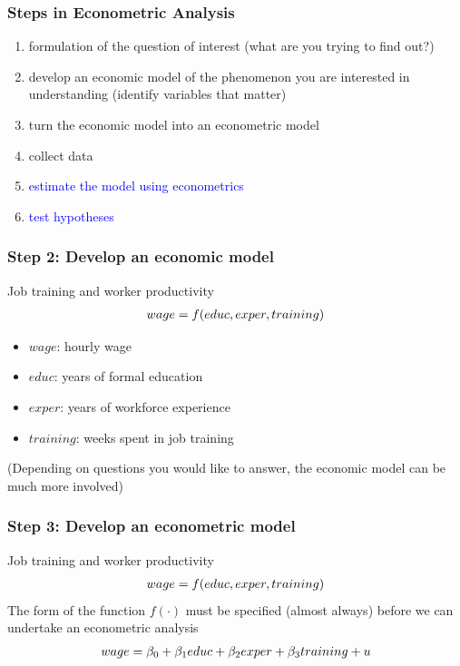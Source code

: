 \documentclass[fleqn]{beamer}\usepackage[]{graphicx}\usepackage[]{color}
\begin{document}
\begin{frame}[c]
  \frametitle{Steps in Econometric Analysis}
  \begin{enumerate}
     \item formulation of the question of interest (what are you trying to find out?)
     \item develop an economic model of the phenomenon you are interested in understanding (identify variables that matter)
     \item turn the economic model into an econometric model
     \item collect data
     \item \textcolor{blue}{estimate the model using econometrics}
     \item \textcolor{blue}{test hypotheses}
  \end{enumerate}
\end{frame}

\begin{frame}[c]
  \frametitle{Step 2: Develop an economic model}
  \begin{block}{Job training and worker productivity}
  \vspace{-0.6cm}
  \begin{align}
     wage = f(educ,exper,training) \notag
  \end{align}
  \begin{itemize}
    \item $wage$: hourly wage
    \item $educ$: years of formal education
    \item $exper$: years of workforce experience
    \item $training$: weeks spent in job training
  \end{itemize}
  \end{block}
  (Depending on questions you would like to answer, the economic model can be much more involved)
\end{frame}

\begin{frame}[c]
  \frametitle{Step 3: Develop an econometric model}

  \begin{block}{Job training and worker productivity}
  \vspace{-0.6cm}
  \begin{align}
     wage = f(educ,exper,training) \notag
  \end{align}
  The form of the function $f(\cdot)$ must be specified (almost always) before we can undertake an econometric analysis
  \begin{align}
     wage = \beta_0 + \beta_1 educ + \beta_2 exper + \beta_3 training + u \notag
  \end{align}

  \end{block}

\end{frame}
\end{document}
